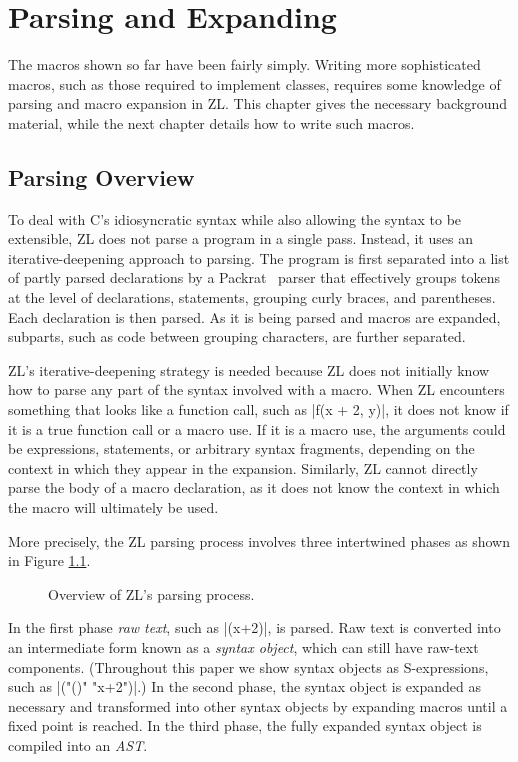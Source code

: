 \chapter{Parsing and Expanding}
\label{parsing}

The macros shown so far have been fairly simply.  Writing more
sophisticated macros, such as those required to implement classes,
requires some knowledge of parsing and macro expansion in ZL.  This
chapter gives the necessary background material, while the next
chapter details how to write such macros.

\section{Parsing Overview}
\label{parsing-overview}

To deal with C's idiosyncratic syntax while also allowing the syntax
to be extensible, ZL does not parse a program in a single pass.
Instead, it uses an iterative-deepening approach to parsing.  The
program is first separated into a list of partly parsed declarations
by a Packrat~\cite{peg-p,peg} parser that effectively groups
tokens at the level of declarations, statements, grouping curly
braces, and parentheses.  Each declaration is then parsed.  As it is
being parsed and macros are expanded, subparts, such as code between
grouping characters, are further separated.

ZL's iterative-deepening strategy is needed because ZL does not
initially know how to parse any part of the syntax involved with a
macro. When ZL encounters something that looks like a function call,
such as |f(x + 2, y)|, it does not know if it is a true function call
or a macro use.  If it is a macro use, the arguments could be
expressions, statements, or arbitrary syntax fragments, depending on
the context in which they appear in the expansion.  Similarly, ZL
cannot directly parse the body of a macro declaration, as it does not
know the context in which the macro will ultimately be used.

\pagebreak

More precisely, the ZL parsing process involves three intertwined
phases as shown in Figure \ref{parsing-overview-fig}. 
\begin{figure}
\begin{center}
\theoverviewfig
\end{center}
\caption{Overview of ZL's parsing process.}
\label{parsing-overview-fig}
\end{figure}
In the first phase \textit{raw text}, such as |(x+2)|, is 
parsed.  Raw text is converted into an intermediate form known as a
\textit{syntax object}, which can still have raw-text components.  
(Throughout this paper we show syntax objects as
S-expressions, such as |("()" "x+2")|.)  In the second phase, the
syntax object is expanded as necessary and transformed into other
syntax objects by expanding macros until a fixed point is reached.  In
the third phase, the fully expanded syntax object is compiled into an
\textit{AST}.

